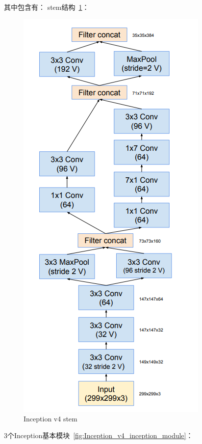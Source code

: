 其中包含有：
stem结构~\ref{fig:Inception_v4_stem}：

\begin{figure}[htbp]
	\centering
	\includegraphics[width=0.7\linewidth]{readings_figures/Inception_v4_stem.png}
	\caption{Inception v4 stem}
	\label{fig:Inception_v4_stem}
\end{figure}

3个Inception基本模块~\ref{fig:Inception_v4_inception_module}：

